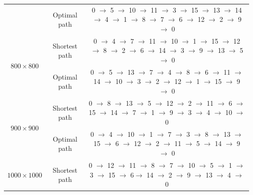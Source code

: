 \documentclass[preprint,5pt]{elsarticle}
\begin{document}
\begin{table}[htbp]
\begin{center}
\begin{tabular}{c c c}
                                                & \multicolumn{1}{c}{{\cellcolor[rgb]{0.729,0.729,0.729}}Optimal path}  {\cellcolor[rgb]{0.729,0.729,0.729}}& 0 $\rightarrow$ 5 $\rightarrow$ 10 $\rightarrow$ 11 $\rightarrow$ 3 $\rightarrow$ 15 $\rightarrow$ 13 $\rightarrow$ 14 $\rightarrow$ 4 $\rightarrow$ 1 $\rightarrow$ 8 $\rightarrow$ 7 $\rightarrow$ 6 $\rightarrow$ 12 $\rightarrow$ 2 $\rightarrow$ 9 $\rightarrow$ 0 \\ %
\multirow{2}{*}{$800\times800$}                & \multicolumn{1}{c}{Shortest path} & 0 $\rightarrow$ 4 $\rightarrow$ 7 $\rightarrow$ 11 $\rightarrow$ 10 $\rightarrow$ 1 $\rightarrow$ 15 $\rightarrow$ 12 $\rightarrow$ 8 $\rightarrow$ 2 $\rightarrow$ 6 $\rightarrow$ 14 $\rightarrow$ 3 $\rightarrow$ 9 $\rightarrow$ 13 $\rightarrow$ 5 $\rightarrow$ 0 \\ %
                                               & \multicolumn{1}{c}{{\cellcolor[rgb]{0.729,0.729,0.729}}Optimal path} {\cellcolor[rgb]{0.729,0.729,0.729}} & 0 $\rightarrow$ 5 $\rightarrow$ 13 $\rightarrow$ 7 $\rightarrow$ 4 $\rightarrow$ 8 $\rightarrow$ 6 $\rightarrow$ 11 $\rightarrow$ 14 $\rightarrow$ 10 $\rightarrow$ 3 $\rightarrow$ 2 $\rightarrow$ 12 $\rightarrow$ 1 $\rightarrow$ 15 $\rightarrow$ 9 $\rightarrow$ 0 \\ %
\multirow{2}{*}{$900\times900$}                & \multicolumn{1}{c}{Shortest path} &0 $\rightarrow$ 8 $\rightarrow$ 13 $\rightarrow$ 5 $\rightarrow$ 12 $\rightarrow$ 2 $\rightarrow$ 11 $\rightarrow$ 6 $\rightarrow$ 15 $\rightarrow$ 14 $\rightarrow$ 7 $\rightarrow$ 1 $\rightarrow$ 9 $\rightarrow$ 3 $\rightarrow$ 4 $\rightarrow$ 10 $\rightarrow$ 0  \\ %
                                               & \multicolumn{1}{c}{{\cellcolor[rgb]{0.729,0.729,0.729}}Optimal path} {\cellcolor[rgb]{0.729,0.729,0.729}}& 0 $\rightarrow$ 4 $\rightarrow$ 10 $\rightarrow$ 1 $\rightarrow$ 7 $\rightarrow$ 3 $\rightarrow$ 8 $\rightarrow$ 13 $\rightarrow$ 15 $\rightarrow$ 6 $\rightarrow$ 12 $\rightarrow$ 2 $\rightarrow$ 11 $\rightarrow$ 5 $\rightarrow$ 14 $\rightarrow$ 9 $\rightarrow$ 0 \\ %
\multirow{2}{*}{$1000\times1000$}              & \multicolumn{1}{c}{Shortest path} &0 $\rightarrow$ 12 $\rightarrow$ 11 $\rightarrow$ 8 $\rightarrow$ 7 $\rightarrow$ 10 $\rightarrow$ 5 $\rightarrow$ 1 $\rightarrow$ 3 $\rightarrow$ 15 $\rightarrow$ 6$\rightarrow$ 14 $\rightarrow$ 2 $\rightarrow$ 9 $\rightarrow$ 13 $\rightarrow$ 4 $\rightarrow$ 0  \\

\end{tabular}
\end{center}
\end{table}
\end{document}
